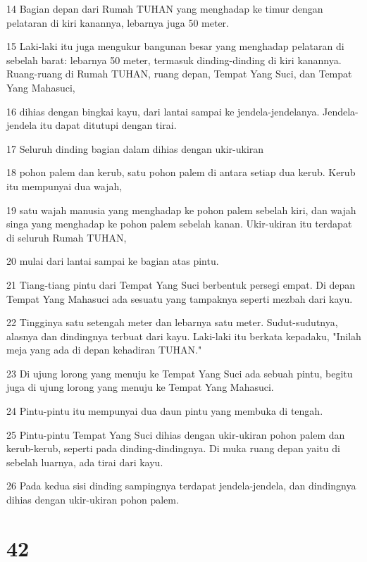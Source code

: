 \par 14 Bagian depan dari Rumah TUHAN yang menghadap ke timur dengan pelataran di kiri kanannya, lebarnya juga 50 meter.
\par 15 Laki-laki itu juga mengukur bangunan besar yang menghadap pelataran di sebelah barat: lebarnya 50 meter, termasuk dinding-dinding di kiri kanannya. Ruang-ruang di Rumah TUHAN, ruang depan, Tempat Yang Suci, dan Tempat Yang Mahasuci,
\par 16 dihias dengan bingkai kayu, dari lantai sampai ke jendela-jendelanya. Jendela-jendela itu dapat ditutupi dengan tirai.
\par 17 Seluruh dinding bagian dalam dihias dengan ukir-ukiran
\par 18 pohon palem dan kerub, satu pohon palem di antara setiap dua kerub. Kerub itu mempunyai dua wajah,
\par 19 satu wajah manusia yang menghadap ke pohon palem sebelah kiri, dan wajah singa yang menghadap ke pohon palem sebelah kanan. Ukir-ukiran itu terdapat di seluruh Rumah TUHAN,
\par 20 mulai dari lantai sampai ke bagian atas pintu.
\par 21 Tiang-tiang pintu dari Tempat Yang Suci berbentuk persegi empat. Di depan Tempat Yang Mahasuci ada sesuatu yang tampaknya seperti mezbah dari kayu.
\par 22 Tingginya satu setengah meter dan lebarnya satu meter. Sudut-sudutnya, alasnya dan dindingnya terbuat dari kayu. Laki-laki itu berkata kepadaku, "Inilah meja yang ada di depan kehadiran TUHAN."
\par 23 Di ujung lorong yang menuju ke Tempat Yang Suci ada sebuah pintu, begitu juga di ujung lorong yang menuju ke Tempat Yang Mahasuci.
\par 24 Pintu-pintu itu mempunyai dua daun pintu yang membuka di tengah.
\par 25 Pintu-pintu Tempat Yang Suci dihias dengan ukir-ukiran pohon palem dan kerub-kerub, seperti pada dinding-dindingnya. Di muka ruang depan yaitu di sebelah luarnya, ada tirai dari kayu.
\par 26 Pada kedua sisi dinding sampingnya terdapat jendela-jendela, dan dindingnya dihias dengan ukir-ukiran pohon palem.

\chapter{42}

